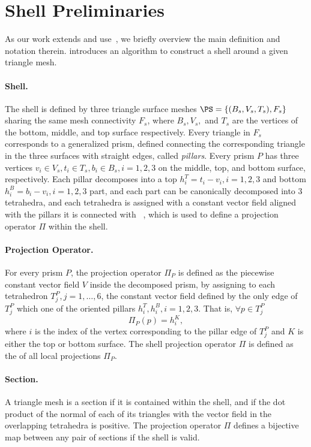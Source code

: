 
\section{Shell Preliminaries}

As our work extends and use~\cite{jiang2020bijective}, we briefly overview the main definition and notation therein. %
\cite{jiang2020bijective} introduces an algorithm to construct a shell around a given triangle mesh. 

\paragraph{Shell.} The shell is defined by three triangle surface meshes $\PS = \{(B_s,V_s,T_s),F_s\}$ sharing the same mesh connectivity $F_s$, where $B_s, V_s,$ and $T_s$ are the vertices of the bottom, middle, and top surface respectively. Every triangle in $F_s$ corresponds to a generalized prism, defined connecting the corresponding triangle in the three surfaces with straight edges, called \emph{pillars}. Every prism $P$ has three vertices $v_i\in V_s, t_i\in T_s, b_i\in B_s, i=1,2,3$ on the middle, top, and bottom surface, respectively. Each pillar decomposes into a top $h_i^T = t_i - v_i, i=1,2,3$ and bottom $h_i^B = b_i - v_i, i=1,2,3$ part, and each part can be canonically decomposed into 3 tetrahedra, and each tetrahedra is assigned with a constant vector field aligned with the pillars it is connected with ~\cite[Figure 5]{jiang2020bijective}, which is used to define a projection operator $\Pi$ within the shell. 

\paragraph{Projection Operator.} For every prism $P$, the projection operator $\Pi_P$ is defined as the piecewise constant vector field $V$ inside the decomposed prism, by assigning to each tetrahedron $T^P_j, j = 1, \dots, 6$, the constant vector field defined by the only edge of $T^P_j$ which one of the oriented pillars $h_i^T, h_i^B, i=1,2,3$. That is, $\forall p \in T^P_j$
\[
\Pi_P(p)=h_i^K, 
\]
where $i$ is the index of the vertex corresponding to the pillar edge of $T^P_j$ and $K$ is either the top or bottom surface. The shell projection operator $\Pi$ is defined as the  of all local projections $\Pi_P$.

\paragraph{Section.} A triangle mesh  is a section if it is contained within the shell, and if the dot product of the normal of each of its triangles with the vector field in the overlapping tetrahedra is positive. The projection operator $\Pi$ defines a bijective map between any pair of sections if the shell is valid.


